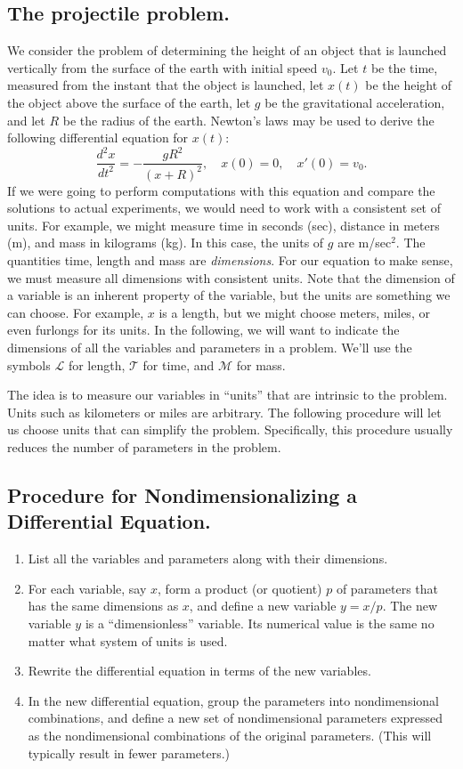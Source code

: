 \documentclass[reqno]{immbook}
\numberwithin{equation}{chapter}
\numberwithin{question}{section}
\numberwithin{theorem}{chapter}
\numberwithin{figure}{chapter}
\theoremstyle{definition}
\begin{document}
\subsection*{The projectile problem.}
We consider the problem of determining the height of an object that is
launched vertically from the surface of the earth with initial speed $v_0$.
Let $t$ be the time, measured from the instant that the
object is launched, let $x(t)$ be the height of the object above
the surface of the earth, let $g$ be the gravitational acceleration,
and let $R$ be the radius of the earth.
Newton's laws may be used to derive the following differential equation
for $x(t)$:
\begin{equation}
   \frac{d^2x}{dt^2} = -\frac{gR^2}{(x+R)^2}, \quad x(0)=0, \quad x'(0)=v_0.
   \label{eqn:projectile}
\end{equation}
If we were going to perform computations with this equation and compare
the solutions to actual experiments, we would need to work with
a consistent set of units.  For example, we might measure time in
seconds (sec), distance in meters (m), and mass in kilograms (kg).
In this case, the units of $g$ are  m/sec$^2$.
The quantities time, length and mass are \emph{dimensions}.
For our equation to make sense, we must measure all dimensions
with consistent units.  Note that the dimension of a variable
is an inherent property of the variable, but the units are something
we can choose. For example, $x$ is a length, but we might
choose meters, miles, or even furlongs for its units.
In the following, we will want to indicate the dimensions
of all the variables and parameters in a problem.
We'll use the symbols $\mathcal{L}$ for length,
$\mathcal{T}$ for time, and $\mathcal{M}$ for mass.

The idea is to measure our variables in ``units''
that are intrinsic to the problem.  Units such as kilometers
or miles are arbitrary. The following procedure
will let us choose units that can simplify the problem.
Specifically, this procedure usually reduces the number
of parameters in the problem.

\subsection*{Procedure for Nondimensionalizing a Differential Equation.}
\begin{enumerate}
\item List all the variables and parameters along with
their dimensions.
\item For each variable, say $x$, form a product
(or quotient) $p$ of parameters that has the same
dimensions as $x$, and define a new variable
$y = x/p$. The new variable $y$ is a ``dimensionless'' variable.
Its numerical value is the same no matter what
system of units is used.
\item Rewrite the differential equation in terms
of the new variables.
\item In the new differential equation, group the parameters
into nondimensional combinations, and define a new set of
nondimensional parameters expressed as the nondimensional
combinations of the original parameters.
(This will typically result in fewer parameters.)
\end{enumerate}
\end{document}
